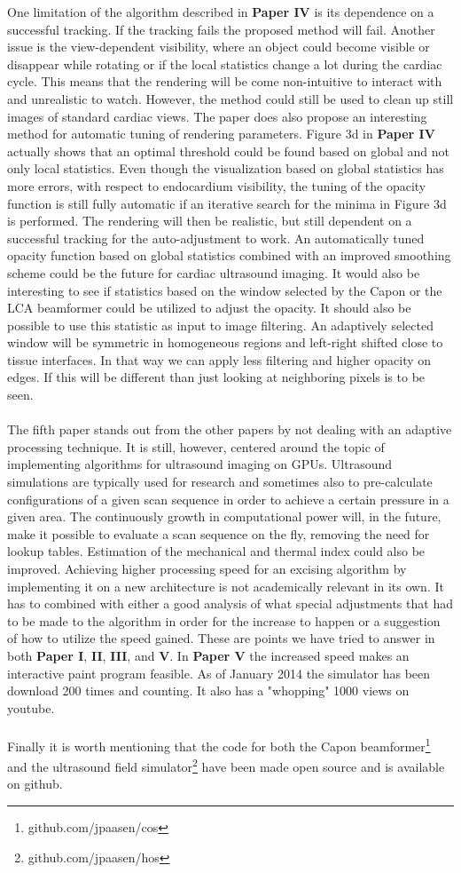 One limitation of the algorithm described in \textbf{Paper IV} is its dependence on a successful tracking. If the tracking fails the proposed method will fail.  Another issue is the view-dependent visibility, where an object could become visible or disappear while rotating or if the local statistics change a lot during the cardiac cycle. This means that the rendering will be come non-intuitive to interact with and unrealistic to watch. However, the method could still be used to clean up still images of standard cardiac views. The paper does also propose an interesting method for automatic tuning of rendering parameters. Figure 3d in \textbf{Paper IV} actually shows that an optimal threshold could be found based on global and not only local statistics. Even though the visualization based on global statistics has more errors, with respect to endocardium visibility, the tuning of the opacity function is still fully automatic if an iterative search for the minima in Figure 3d is performed. The rendering will then be realistic, but still dependent on a successful tracking for the auto-adjustment to work. An automatically tuned opacity function based on global statistics combined with an improved smoothing scheme could be the future for cardiac ultrasound imaging. It would also be interesting to see if statistics based on the window selected by the Capon or the LCA beamformer could be utilized to adjust the opacity. It should also be possible to use this statistic as input to image filtering. An adaptively selected window will be symmetric in homogeneous regions and left-right shifted close to tissue interfaces. In that way we can apply less filtering and higher opacity on edges. If this will be different than just looking at neighboring pixels is to be seen.
\\\\
The fifth paper stands out from the other papers by not dealing with an adaptive processing technique. It is still, however, centered around the topic of implementing algorithms for ultrasound imaging on GPUs. Ultrasound simulations are typically used for research and sometimes also to pre-calculate configurations of a given scan sequence in order to achieve a certain pressure in a given area. The continuously growth in computational power will, in the future, make it possible to evaluate a scan sequence on the fly, removing the need for lookup tables. Estimation of the mechanical and thermal index could also be improved. Achieving higher processing speed for an excising algorithm by implementing it on a new architecture is not academically relevant in its own. It has to combined with either a good analysis of what special adjustments that had to be made to the algorithm in order for the increase to happen or a suggestion of how to utilize the speed gained. These are points we have tried to answer in both \textbf{Paper I}, \textbf{II},  \textbf{III}, and \textbf{V}.  In \textbf{Paper V} the increased speed makes an interactive paint program feasible. As of January 2014 the simulator has been download 200 times and counting. It also has a "whopping" 1000 views on youtube. 
\\\\
Finally it is worth mentioning that the code for both the Capon beamformer\footnote{github.com/jpaasen/cos} and the ultrasound field simulator\footnote{github.com/jpaasen/hos} have been made open source and is available on github. 
\endinput